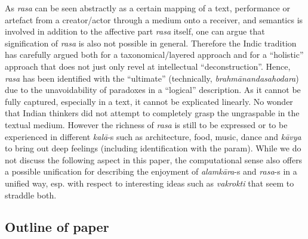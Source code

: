 As \textsl{rasa} can be seen abstractly as a certain mapping of a text, performance or artefact from a creator/actor through a medium onto a receiver, and semantics is involved in addition to the affective part \textsl{rasa} itself, one can argue that signification of \textsl{rasa} is also not possible in general. Therefore the Indic tradition has carefully argued both for a taxonomical/layered approach and for a “holistic” approach that does not just only revel at intellectual “deconstruction”. Hence, \textsl{rasa} has been identified with the “ultimate” (technically, \textsl{brahmānandasahodara}) due to the unavoidability of paradoxes in a “logical” description. As it cannot be fully captured, especially in a text, it cannot be explicated linearly. No wonder that Indian thinkers did not attempt to completely grasp the ungraspable in the textual medium. However the richness of \textsl{rasa} is still to be expressed or to be experienced in different \textsl{kalā}-s such as architecture, food, music, dance and \textsl{kāvya} to bring out deep feelings (including identification with the param). While we do not discuss the following aspect in this paper, the computational sense also offers a possible unification for describing the enjoyment of \textsl{alamkāra}-s and \textsl{rasa}-s in a unified way, esp. with respect to interesting ideas such as \textsl{vakrokti} that seem to straddle both.

\subsection{Outline of paper}\label{chap7-sec1.2}

